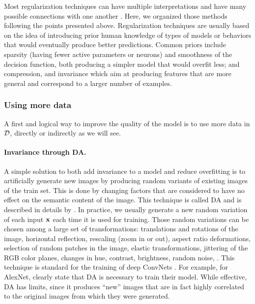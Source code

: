 Most regularization techniques can have multiple interpretations and have many possible connections with one another \citep[\cf\unskip][chapter 7]{GoodfellowDL}. Here, we organized those methods following the points presented above.
Regularization techniques are usually based on the idea of introducing prior human knowledge of types of models or behaviors that would eventually produce better predictions. Common priors include sparsity (having fewer active parameters or neurons) and smoothness of the decision function, both producing a simpler model that would overfit less; and compression, and invariance which aim at producing features that are more general and correspond to a larger number of examples.

\subsubsection{Using more data}

A first and logical way to improve the quality of the model is to use more data in $\mathcal{D}$, directly or indirectly as we will see.

\paragraph{Invariance through \acf{DA}.}
A simple solution to both add invariance to a model and reduce overfitting is to artificially generate new images by producing random variants of existing images of the train set. This is done by changing factors that are considered to have no effect on the semantic content of the image. This technique is called \acf{DA} and is described in details by \citet{dataaugmentation}. In practice, we usually generate a new random variation of each input $\mathbf{x}$ each time it is used for training. Those random variations can be chosen among a large set of transformations: translations and rotations of the image, horizontal reflection, rescaling (zoom in or out), aspect ratio deformations, selection of random patches in the image, elastic transformations, jittering of the RGB color planes, changes in hue, contrast, brightness, random noise, \etc. This technique is standard for the training of deep \acp{ConvNet} \citep{simard2003best,cirecsan2012multi,alexnet}. For example, for AlexNet, \citet{alexnet} clearly state that \ac{DA} is necessary to train their model. While effective, \ac{DA} has limits, since it produces ``new'' images that are in fact highly correlated to the original images from which they were generated.

